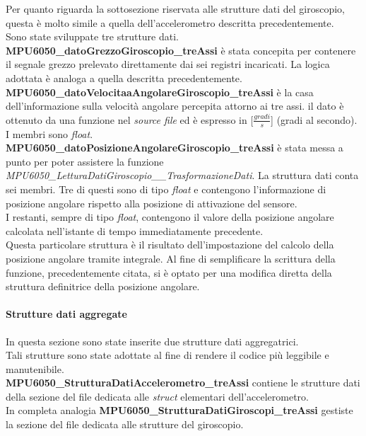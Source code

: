 \documentclass[11pt]{report}
\begin{document}
Per quanto riguarda la sottosezione riservata alle strutture dati del giroscopio, questa è  molto simile a quella dell'accelerometro descritta precedentemente.\\
Sono state sviluppate tre strutture dati.\\
\textbf{MPU6050\_datoGrezzoGiroscopio\_treAssi} è stata concepita per contenere il segnale grezzo prelevato direttamente dai sei registri incaricati. La logica adottata è analoga a quella descritta precedentemente.\\
\textbf{MPU6050\_datoVelocitaaAngolareGiroscopio\_treAssi} è la casa dell'informazione sulla velocità angolare percepita attorno ai tre assi. il dato è ottenuto da una funzione nel \textit{source file} ed è espresso in [$\frac{gradi}{s}$] (gradi al secondo). I membri sono \textit{float}.\\
\textbf{MPU6050\_datoPosizioneAngolareGiroscopio\_treAssi} è stata messa a punto per poter assistere la funzione \textit{MPU6050\_LetturaDatiGiroscopio\_\_TrasformazioneDati}. La struttura dati conta sei membri. Tre di questi sono di tipo \textit{float} e contengono l'informazione di posizione angolare rispetto alla posizione di attivazione del sensore.\\
I restanti, sempre di tipo \textit{float}, contengono il valore della posizione angolare calcolata nell'istante di tempo immediatamente precedente.\\
Questa particolare struttura è il risultato dell'impostazione del calcolo della posizione angolare tramite integrale. Al fine di semplificare la scrittura della funzione, precedentemente citata, si è optato per una modifica diretta della struttura definitrice della posizione angolare.


\paragraph{Strutture dati aggregate}
In questa sezione sono state inserite due strutture dati aggregatrici.\\
Tali strutture sono state adottate al fine di rendere il codice più leggibile e manutenibile.\\
\textbf{MPU6050\_StrutturaDatiAccelerometro\_treAssi} contiene le strutture dati della sezione del file dedicata alle \textit{struct} elementari dell'accelerometro.\\In completa analogia
\textbf{MPU6050\_StrutturaDatiGiroscopi\_treAssi} gestiste la sezione del file dedicata alle strutture del giroscopio.

\end{document}
